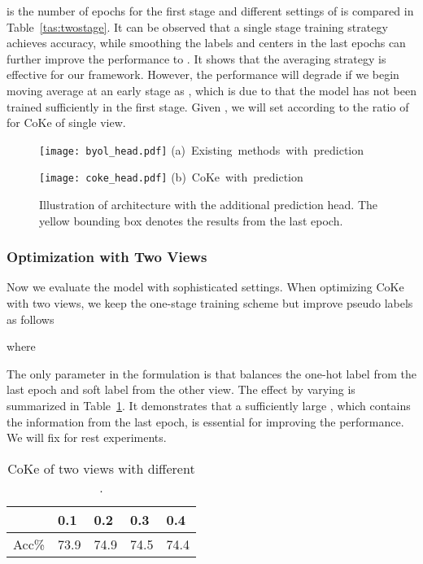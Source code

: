 \documentclass[10pt,twocolumn,letterpaper]{article}
\begin{document}
 is the number of epochs for the first stage and different settings of  is compared in Table~\ref{tas:twostage}. It can be observed that a single stage training strategy achieves  accuracy, while smoothing the labels and centers in the last  epochs can further improve the performance to . It shows that the averaging strategy is effective for our framework. However, the performance will degrade if we begin moving average at an early stage as , which is due to that the model has not been trained sufficiently in the first stage. Given , we will set  according to the ratio of  for CoKe of single view.

\begin{figure*}[!ht]
\centering
\begin{minipage}{0.45\linewidth}
\centering
\texttt{[image: byol\_head.pdf]}
\mbox{\footnotesize (a) Existing methods with prediction}
\end{minipage}
\begin{minipage}{0.45\linewidth}
\centering
\texttt{[image: coke\_head.pdf]}
\mbox{\footnotesize (b) CoKe with prediction}
\end{minipage}
\caption{Illustration of architecture with the additional prediction head. The yellow bounding box denotes the results from the last epoch.}\label{figs:pred}
\end{figure*}

\subsubsection{Optimization with Two Views}
Now we evaluate the model with sophisticated settings. When optimizing CoKe with two views, we keep the one-stage training scheme but improve pseudo labels as follows

where 

The only parameter in the formulation is  that balances the one-hot label from the last epoch and soft label from the other view. The effect by varying  is summarized in Table~\ref{tas:alpha}. It demonstrates that a sufficiently large , which contains the information from the last epoch, is essential for improving the performance. We will fix  for rest experiments. 

\begin{table}[!ht]
\centering
\begin{tabular}{|l|l|l|l|l|}\hline
&0.1&0.2&0.3&0.4\\\hline
Acc\% &73.9&74.9&74.5&74.4 \\\hline
\end{tabular}
\caption{CoKe of two views with different .}\label{tas:alpha}
\end{table}
\end{document}
